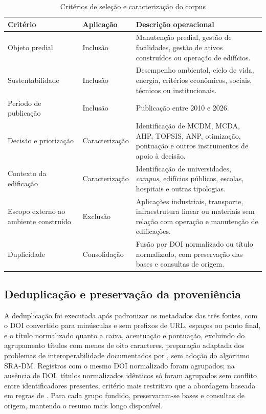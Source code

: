 \begin{table}[htbp]
\centering
\caption{Critérios de seleção e caracterização do corpus}
\label{tab:criteriosincluexclu}
\footnotesize
\begin{tabularx}{\textwidth}{>{\RaggedRight\arraybackslash}p{3.4cm} >{\RaggedRight\arraybackslash}p{2.7cm} Y}
\toprule
Critério & Aplicação & Descrição operacional \\
\midrule
Objeto predial & Inclusão & Manutenção predial, gestão de facilidades, gestão de ativos construídos ou operação de edifícios. \\
Sustentabilidade & Inclusão & Desempenho ambiental, ciclo de vida, energia, critérios econômicos, sociais, técnicos ou institucionais. \\
Período de publicação & Inclusão & Publicação entre 2010 e 2026. \\
Decisão e priorização & Caracterização & Identificação de MCDM, MCDA, AHP, TOPSIS, ANP, otimização, pontuação e outros instrumentos de apoio à decisão. \\
Contexto da edificação & Caracterização & Identificação de universidades, \textit{campus}, edifícios públicos, escolas, hospitais e outras tipologias. \\
Escopo externo ao ambiente construído & Exclusão & Aplicações industriais, transporte, infraestrutura linear ou materiais sem relação com operação e manutenção de edificações. \\
Duplicidade & Consolidação & Fusão por DOI normalizado ou título normalizado, com preservação das bases e consultas de origem. \\
\bottomrule
\end{tabularx}
\fonteautor
\end{table}

\subsection{Deduplicação e preservação da proveniência}

A deduplicação foi executada após padronizar os metadados das três fontes, com o DOI convertido para minúsculas e sem prefixos de URL, espaços ou ponto final, e o título normalizado quanto a caixa, acentuação e pontuação, excluindo do agrupamento títulos com menos de oito caracteres, preparação adaptada dos problemas de interoperabilidade documentados por \textcite{rathbone_deduplicacao_2015}, sem adoção do algoritmo SRA-DM. Registros com o mesmo DOI normalizado foram agrupados; na ausência de DOI, títulos normalizados idênticos só foram agrupados sem conflito entre identificadores presentes, critério mais restritivo que a abordagem baseada em regras de \textcite{jiang_deduplicacao_regras_2014}. Para cada grupo fundido, preservaram-se bases e consultas de origem, mantendo o resumo mais longo disponível.

